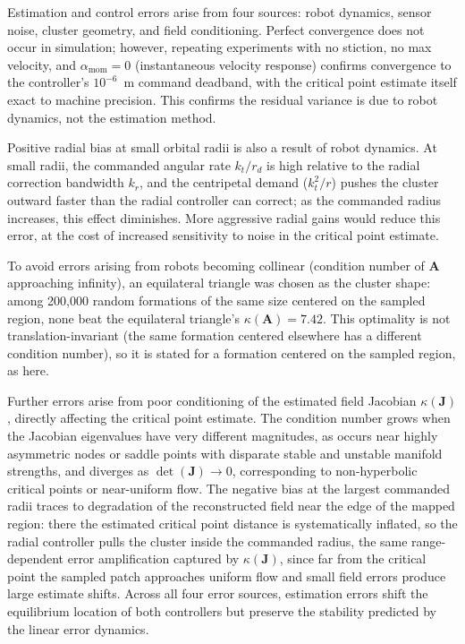 \documentclass[12pt, letterpaper, oneside]{report}
\begin{document}
Estimation and control errors arise from four sources: robot dynamics,
sensor noise, cluster geometry, and field conditioning. Perfect convergence
does not occur in simulation; however, repeating experiments with no
stiction, no max velocity, and $\alpha_{\text{mom}}=0$ (instantaneous
velocity response) confirms convergence to the controller's $10^{-6}$~m
command deadband, with the critical point estimate itself exact to machine
precision. This confirms the residual variance is due to robot dynamics,
not the estimation method.

Positive radial bias at small orbital radii is also a result of robot
dynamics. At small radii, the commanded angular rate $k_t/r_d$ is high
relative to the radial correction bandwidth $k_r$, and the centripetal
demand ($k_t^2/r$) pushes the cluster outward faster than the radial
controller can correct; as the commanded radius increases, this effect
diminishes. More aggressive radial gains would reduce this error, at the
cost of increased sensitivity to noise in the critical point estimate.

To avoid errors arising from robots becoming collinear (condition number of
$\mathbf{A}$ approaching infinity), an equilateral triangle was chosen as
the cluster shape: among 200{,}000 random formations of the same size
centered on the sampled region, none beat the equilateral triangle's
$\kappa(\mathbf{A})=7.42$. This optimality is not translation-invariant
(the same formation centered elsewhere has a different condition number),
so it is stated for a formation centered on the sampled region, as here.

Further errors arise from poor conditioning of the estimated field
Jacobian $\kappa(\mathbf{J})$, directly affecting the critical point
estimate. The condition number grows when the Jacobian eigenvalues have
very different magnitudes, as occurs near highly asymmetric nodes or
saddle points with disparate stable and unstable manifold strengths, and
diverges as $\det(\mathbf{J})\to0$, corresponding to non-hyperbolic
critical points or near-uniform flow. The negative bias at the largest
commanded radii traces to degradation of the reconstructed field near the
edge of the mapped region: there the estimated critical point distance is
systematically inflated, so the radial controller pulls the cluster inside
the commanded radius, the same range-dependent error amplification
captured by $\kappa(\mathbf{J})$, since far from the critical point the
sampled patch approaches uniform flow and small field errors produce large
estimate shifts. Across all four error sources, estimation errors shift the
equilibrium location of both controllers but preserve the stability
predicted by the linear error dynamics.
\end{document}
